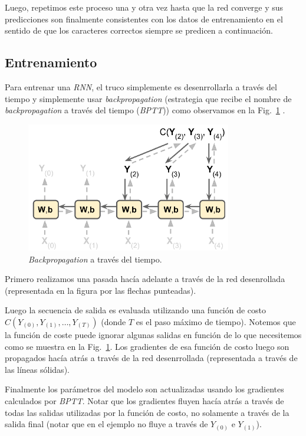 \documentclass[a4paper,12pt]{article}
\begin{document}
Luego, repetimos este proceso una y otra vez hasta que la red converge y sus predicciones son finalmente consistentes con los datos de entrenamiento en el sentido de que los caracteres correctos siempre se predicen a continuación.

\subsection{Entrenamiento}
Para entrenar una \textit{RNN}, el truco simplemente es desenrrollarla a través del tiempo y simplemente usar \textit{backpropagation} (estrategia que recibe el nombre de \textit{backpropagation} a través del tiempo (\textit{BPTT})) como observamos en la Fig.~\ref{fig:BPTT} \citep{geron}.

\begin{figure}[H]
	\begin{center}				
	\includegraphics[width=0.8\textwidth]{tesis_40.png}
  	\caption{\textit{Backpropagation} a través del tiempo.}
  	\label{fig:BPTT}
  	\end{center}
\end{figure}

Primero realizamos una pasada hacía adelante a través de la red desenrollada (representada en la figura por las flechas punteadas). 

Luego la secuencia de salida es evaluada utilizando una función de costo $C(Y_{(0)}, Y_{(1)}, \dots, Y_{(T)})$ (donde $T$ es el paso máximo de tiempo). Notemos que la función de coste puede ignorar algunas salidas en función de lo que necesitemos como se muestra en la Fig.~\ref{fig:BPTT}.
Los gradientes de esa función de costo luego son propagados hacía atrás a través de la red desenrrollada (representada a través de las líneas sólidas).

Finalmente los parámetros del modelo son actualizadas usando los gradientes calculados por \textit{BPTT}. Notar que los gradientes fluyen hacía atrás a través de todas las salidas utilizadas por la función de costo, no solamente a través de la salida final (notar que en el ejemplo no fluye a través de $Y_{(0)}$ e $Y_{(1)}$).
\end{document}
